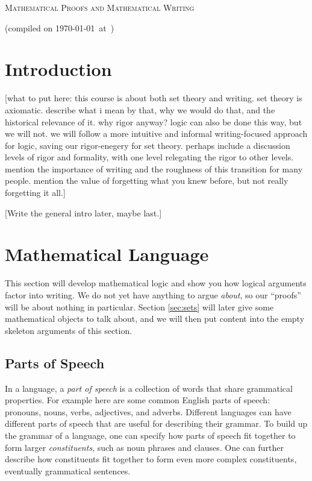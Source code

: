 \documentclass[12pt]{article}
\newcommand{\note}[1]{[#1]}
\begin{document}
\begin{center} {\Large \scshape Mathematical Proofs and Mathematical Writing}
\end{center}
(compiled on \today\ at\ \currenttime)
\hfill

\tableofcontents

\section{Introduction}

\note{what to put here:
this course is about both set theory and writing.
set theory is axiomatic. describe what i mean by that, why we would do that, and the historical relevance of it.
why rigor anyway?
logic can also be done this way, but we will not.
we will follow a more intuitive and informal writing-focused approach for logic,
saving our rigor-enegery for set theory.
perhaps include a discussion levels of rigor and formality, with one level relegating the rigor to other levels.
mention the importance of writing and the roughness of this transition for many people.
mention the value of forgetting what you knew before, but not really forgetting it all.}

\note{Write the general intro later, maybe last.}



\section{Mathematical Language}
\label{sec:logic}

This section will develop mathematical logic and show you how logical arguments factor into writing.
We do not yet have anything to argue \emph{about}, so our ``proofs'' will be about nothing in particular.
Section \ref{sec:sets} will later give some mathematical objects to talk about, and we will then put
content into the empty skeleton arguments of this section.

\subsection{Parts of Speech}
\label{sec:parts_of_speech}

In a language, a \emph{part of speech} is a collection of words that share grammatical properties.
For example here are some common English parts of speech: pronouns, nouns, verbs, adjectives, and adverbs.
Different languages can have different parts of speech that are useful for describing their grammar.
To build up the grammar of a language, one can specify how parts of speech fit together to form larger
\emph{constituents}, such as noun phrases and clauses. One can further describe how
constituents fit together to form even more complex constituents, eventually grammatical sentences.
\end{document}
